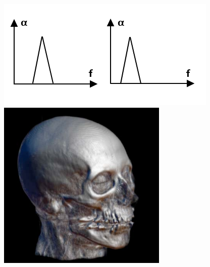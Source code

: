\documentclass{egpubl}
\begin{document}
\begin{figure}
	\centering
	\begin{minipage}{0.4\textwidth}
		\centering
		\includegraphics[width=1\linewidth]{images/glk_transfunction_tf.png}
	\end{minipage}
	\begin{minipage}{0.2\textwidth}
		\centering
		\includegraphics[width=1\linewidth]{images/glk_transfunction_1.png}
	\end{minipage}~

\end{figure}
\end{document}
